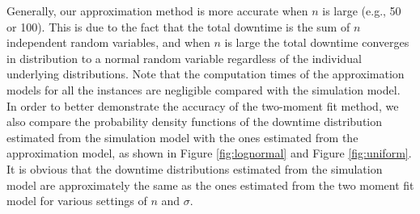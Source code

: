 \documentclass[preprint,12pt]{elsarticle}
\begin{document}
Generally, our approximation method is more accurate when $n$ is large (e.g., 50 or 100). This is due to the fact that the total downtime is the sum of $n$ independent random variables, and when $n$ is large the total downtime converges in distribution to a normal random variable regardless of the individual underlying distributions. Note that the computation times of the approximation models for all the instances are negligible compared with the simulation model. In order to better demonstrate the accuracy of the two-moment fit method, we also compare the probability density functions of the downtime distribution estimated from the simulation model with the ones estimated from the approximation model, as shown in Figure \ref{fig:lognormal} and Figure \ref{fig:uniform}. It is obvious that the downtime distributions estimated from the simulation model are approximately the same as the ones estimated from the two moment fit model for various settings of $n$ and $\sigma$.
\small
\end{document}
